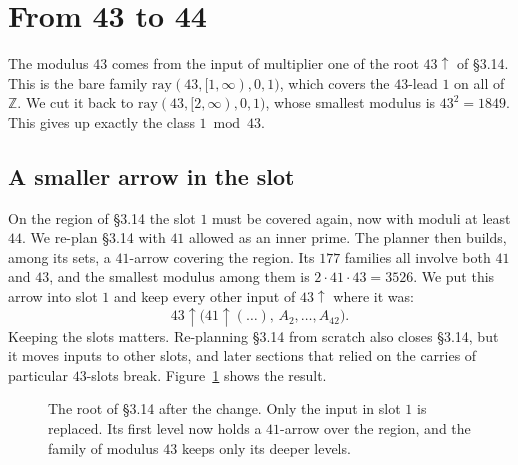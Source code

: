 \documentclass[11pt]{amsart}
\theoremstyle{definition}
\theoremstyle{remark}
\newcommand{\Z}{\mathbb{Z}}
\newcommand{\up}{{\uparrow}}
\newcommand{\ray}{\mathrm{ray}}
\begin{document}
\section{From 43 to 44}\label{sec:44}

The modulus $43$ comes from the input of multiplier one of the root $43\up$ of §3.14. This is the bare family
$\ray(43,[1,\infty),0,1)$, which covers the $43$-lead $1$ on all of $\Z$. We cut it back to $\ray(43,[2,\infty),0,1)$,
whose smallest modulus is $43^2=1849$. This gives up exactly the class $1 \bmod 43$.

\subsection*{A smaller arrow in the slot}
On the region of §3.14 the slot $1$ must be covered again, now with moduli at least $44$. We re-plan §3.14 with $41$
allowed as an inner prime. The planner then builds, among its sets, a $41$-arrow covering the region. Its $177$
families all involve both $41$ and $43$, and the smallest modulus among them is $2\cdot41\cdot43=3526$. We put this
arrow into slot $1$ and keep every other input of $43\up$ where it was:
\[
43\up\bigl(41\up(\dots),\,A_2,\dots,A_{42}\bigr).
\]
Keeping the slots matters. Re-planning §3.14 from scratch also closes §3.14, but it moves inputs to other slots, and
later sections that relied on the carries of particular $43$-slots break. Figure~\ref{fig:nest} shows the result.

\begin{figure}[ht]
\centering
{}
\caption{The root of §3.14 after the change. Only the input in slot $1$ is replaced. Its first level now holds a
$41$-arrow over the region, and the family of modulus $43$ keeps only its deeper levels.}\label{fig:nest}
\end{figure}
\end{document}
